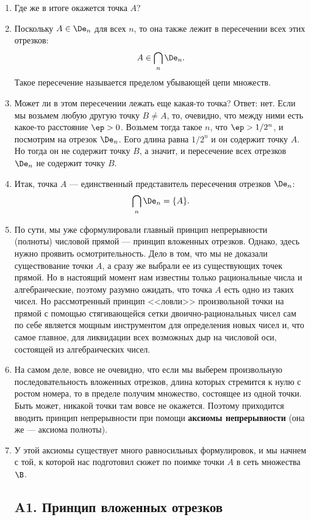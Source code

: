 \begin{enumerate}
\item Где же в итоге окажется точка $A$?
\item Поскольку $A\in\De_n$ для всех $n$, то она также лежит в пересечении всех этих отрезков:
$$
A\in\bigcap_n\De_n.
$$
Такое пересечение называется пределом убывающей цепи множеств.
\item Может ли в этом пересечении лежать еще какая-то точка? Ответ: нет. Если мы возьмем любую другую точку $B\ne A$, то, очевидно, что между ними есть какое-то расстояние $\ep>0$. Возьмем тогда такое $n$, что $\ep>1/2^n$, и посмотрим на отрезок $\De_n$. Еого длина равна $1/2^n$ и он содержит точку $A$. Но тогда он не содержит точку $B$, а значит, и пересечение всех отрезков $\De_n$ не содержит точку $B$.
\item Итак, точка $A$ --- единственный представитель пересечения отрезков $\De_n$:
$$
\bigcap_n\De_n = \{A\}.
$$
\item По сути, мы уже сформулировали главный принцип непрерывности (полноты) числовой прямой --- принцип вложенных отрезков. Однако, здесь нужно проявить осмотрительность. Дело в том, что мы не доказали существование точки $A$, а сразу же выбрали ее из существующих точек прямой. Но в настоящий момент нам известны только рациональные числа и алгебраические, поэтому разумно ожидать, что точка $A$ есть одно из таких чисел. Но рассмотренный принцип <<ловли>> произвольной точки на прямой с помощью стягивающейся сетки двоично-рациональных чисел сам по себе является мощным инструментом для определения новых чисел и, что самое главное, для ликвидации всех возможных дыр на числовой оси, состоящей из алгебраических чисел.





\item На самом деле, вовсе не очевидно, что если мы выберем произвольную последовательность вложенных отрезков, длина которых стремится к нулю с ростом номера, то в пределе получим множество, состоящее из одной точки. Быть может, никакой точки там вовсе не окажется. Поэтому приходится вводить принцип непрерывности при помощи \textbf{аксиомы непрерывности} (она же --- аксиома полноты).
\item У этой аксиомы существует много равносильных формулировок, и мы начнем с той, к которой нас подготовил сюжет по поимке точки $A$ в сеть множества $\B$.

\subsection*{A1. Принцип вложенных отрезков}




\end{enumerate}
